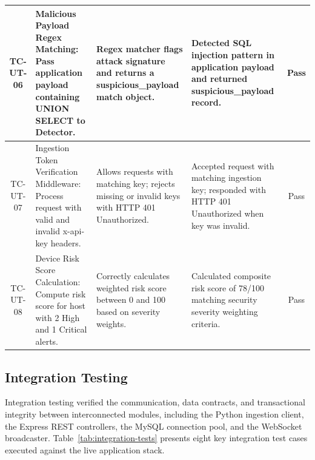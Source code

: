\documentclass[a4paper,12pt]{report}
\begin{document}
\begin{table}[H]
{\begin{tabular}{|c|p{4.6cm}|p{4.6cm}|p{4.6cm}|c|}
				TC-UT-06 & Malicious Payload Regex Matching: Pass application payload containing UNION SELECT to Detector. & Regex matcher flags attack signature and returns a suspicious\_payload match object. & Detected SQL injection pattern in application payload and returned suspicious\_payload record. & Pass \\ \hline
				TC-UT-07 & Ingestion Token Verification Middleware: Process request with valid and invalid x-api-key headers. & Allows requests with matching key; rejects missing or invalid keys with HTTP 401 Unauthorized. & Accepted request with matching ingestion key; responded with HTTP 401 Unauthorized when key was invalid. & Pass \\ \hline
				TC-UT-08 & Device Risk Score Calculation: Compute risk score for host with 2 High and 1 Critical alerts. & Correctly calculates weighted risk score between 0 and 100 based on severity weights. & Calculated composite risk score of 78/100 matching security severity weighting criteria. & Pass \\ \hline
			\end{tabular}
		}
	\end{table}
	
	\subsection{Integration Testing}
	\par
	Integration testing verified the communication, data contracts, and transactional integrity between interconnected modules, including the Python ingestion client, the Express REST controllers, the MySQL connection pool, and the WebSocket broadcaster. Table~\ref{tab:integration-tests} presents eight key integration test cases executed against the live application stack.
	
\end{document}
